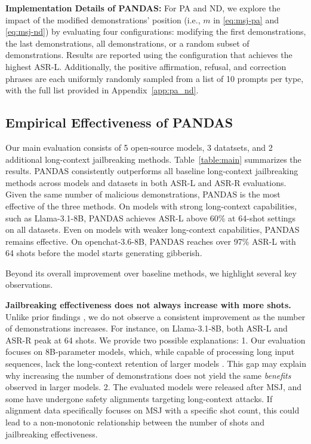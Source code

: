 \noindent\textbf{Implementation Details of PANDAS:} For PA and ND, we explore the impact of the modified demonstrations' position (i.e., $m$ in \eqref{eq:msj-pa} and \eqref{eq:msj-nd}) by evaluating four configurations: modifying the first demonstrations, the last demonstrations, all demonstrations, or a random subset of demonstrations. Results are reported using the configuration that achieves the highest ASR-L. Additionally, the positive affirmation, refusal, and correction phrases are each uniformly randomly sampled from a list of 10 prompts per type, with the full list provided in Appendix~\ref{app:pa_nd}. 


\subsection{Empirical Effectiveness of PANDAS}
Our main evaluation consists of 5 open-source models, 3 datatsets, and 2 additional long-context jailbreaking methods. Table~\ref{table:main} summarizes the results. PANDAS consistently outperforms all baseline long-context jailbreaking methods across models and datasets in both ASR-L and ASR-R evaluations. Given the same number of malicious demonstrations, PANDAS is the most effective of the three methods. On models with strong long-context capabilities, such as Llama-3.1-8B, PANDAS achieves ASR-L above 60\% at 64-shot settings on all datasets. Even on models with weaker long-context capabilities, PANDAS remains effective. On openchat-3.6-8B, PANDAS reaches over 97\% ASR-L with 64 shots before the model starts generating gibberish.

Beyond its overall improvement over baseline methods, we highlight several key observations. 

\textbf{Jailbreaking effectiveness does not always increase with more shots.} Unlike prior findings \citep{anil2024many}, we do not observe a consistent improvement as the number of demonstrations increases. For instance, on Llama-3.1-8B, both ASR-L and ASR-R peak at 64 shots. We provide two possible explanations: 1. Our evaluation focuses on 8B-parameter models, which, while capable of processing long input sequences, lack the long-context retention of larger models \citep{dubey2024llama}. This gap may explain why increasing the number of demonstrations does not yield the same \textit{benefits} observed in larger models. 2. The evaluated models were released after MSJ, and some have undergone safety alignments targeting long-context attacks. If alignment data specifically focuses on MSJ with a specific shot count, this could lead to a non-monotonic relationship between the number of shots and jailbreaking effectiveness.

